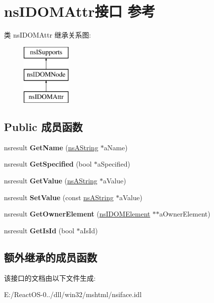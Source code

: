 \hypertarget{interfacens_i_d_o_m_attr}{}\section{ns\+I\+D\+O\+M\+Attr接口 参考}
\label{interfacens_i_d_o_m_attr}
类 ns\+I\+D\+O\+M\+Attr 继承关系图\+:\begin{figure}[H]
\begin{center}
\leavevmode
\includegraphics[height=3.000000cm]{interfacens_i_d_o_m_attr}
\end{center}
\end{figure}
\subsection*{Public 成员函数}
\begin{DoxyCompactItemize}
\item 
\mbox{\label{interfacens_i_d_o_m_attr_af156f1bade9f4fcdd08676b280c0888f}} 
nsresult {\bfseries Get\+Name} (\hyperlink{structns_string_container}{ns\+A\+String} $\ast$a\+Name)
\item 
\mbox{\label{interfacens_i_d_o_m_attr_a4dccfbabe4076f3ffd8c0490cef8836c}} 
nsresult {\bfseries Get\+Specified} (bool $\ast$a\+Specified)
\item 
\mbox{\label{interfacens_i_d_o_m_attr_a75a8cea21596681c5a07a86c6c30c522}} 
nsresult {\bfseries Get\+Value} (\hyperlink{structns_string_container}{ns\+A\+String} $\ast$a\+Value)
\item 
\mbox{\label{interfacens_i_d_o_m_attr_a870df5a949fdc2c16280f2542a1b5433}} 
nsresult {\bfseries Set\+Value} (const \hyperlink{structns_string_container}{ns\+A\+String} $\ast$a\+Value)
\item 
\mbox{\label{interfacens_i_d_o_m_attr_a5e3c8da506a82dc8fa95d7ca74dbfae8}} 
nsresult {\bfseries Get\+Owner\+Element} (\hyperlink{interfacens_i_d_o_m_element}{ns\+I\+D\+O\+M\+Element} $\ast$$\ast$a\+Owner\+Element)
\item 
\mbox{\label{interfacens_i_d_o_m_attr_a1c10ec488120f1878830e5d545efd5ee}} 
nsresult {\bfseries Get\+Is\+Id} (bool $\ast$a\+Is\+Id)
\end{DoxyCompactItemize}
\subsection*{额外继承的成员函数}


该接口的文档由以下文件生成\+:\begin{DoxyCompactItemize}
\item 
E\+:/\+React\+O\+S-\/0../dll/win32/mshtml/nsiface.\+idl\end{DoxyCompactItemize}

